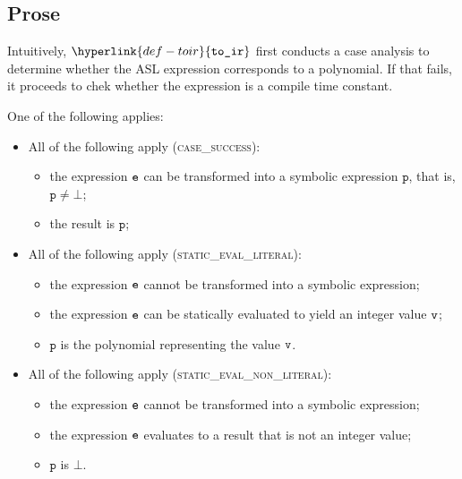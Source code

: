 \documentclass{book}
\newcommand\toir[0]{\hyperlink{def-toir}{\texttt{to\_ir}}}
\newcommand\vp[0]{\texttt{p}}
\begin{document}
\subsection{Prose}
Intuitively, $\toir$ first conducts a case analysis to determine whether the ASL expression corresponds to a polynomial.
If that fails, it proceeds to chek whether the expression is a compile time constant.

One of the following applies:
\begin{itemize}
  \item All of the following apply (\textsc{case\_success}):
  \begin{itemize}
    \item the expression $\texttt{e}$ can be transformed into a symbolic expression $\vp$,
          that is, $\vp \neq \bot$;
    \item the result is $\vp$;
  \end{itemize}

  \item All of the following apply (\textsc{static\_eval\_literal}):
  \begin{itemize}
    \item the expression $\texttt{e}$ cannot be transformed into a symbolic expression;
    \item the expression $\texttt{e}$ can be statically evaluated to yield an integer value $\texttt{v}$;
    \item $\vp$ is the polynomial representing the value $\texttt{v}$.
  \end{itemize}

  \item All of the following apply (\textsc{static\_eval\_non\_literal}):
  \begin{itemize}
    \item the expression $\texttt{e}$ cannot be transformed into a symbolic expression;
    \item the expression $\texttt{e}$ evaluates to a result that is not an integer value;
    \item $\vp$ is $\bot$.
  \end{itemize}
\end{itemize}
\end{document}
